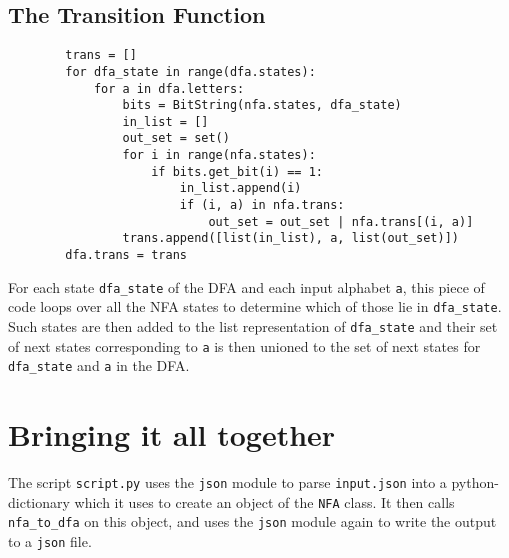\documentclass[12pt]{scrreprt}
\begin{document}
    \subsection*{The Transition Function}

    \begin{verbatim}
        trans = []
        for dfa_state in range(dfa.states):
            for a in dfa.letters:
                bits = BitString(nfa.states, dfa_state)
                in_list = []
                out_set = set()
                for i in range(nfa.states):
                    if bits.get_bit(i) == 1:
                        in_list.append(i)
                        if (i, a) in nfa.trans:
                            out_set = out_set | nfa.trans[(i, a)]
                trans.append([list(in_list), a, list(out_set)])
        dfa.trans = trans
    \end{verbatim}
    For each state \texttt{dfa_state} of the DFA and each input alphabet \texttt{a}, this piece of code loops over all the NFA states to determine which of those lie in \texttt{dfa_state}. Such states are then added to the list representation of \texttt{dfa_state} and their set of next states corresponding to \texttt{a} is then unioned to the set of next states for \texttt{dfa_state} and \texttt{a} in the DFA.

    \section{Bringing it all together}
    The script \texttt{script.py} uses the \texttt{json} module to parse \texttt{input.json} into a python-dictionary which it uses to create an object of the \texttt{NFA} class. It then calls  \texttt{nfa_to_dfa} on this object, and uses the \texttt{json} module again to write the output to a \texttt{json} file.
\end{document}
